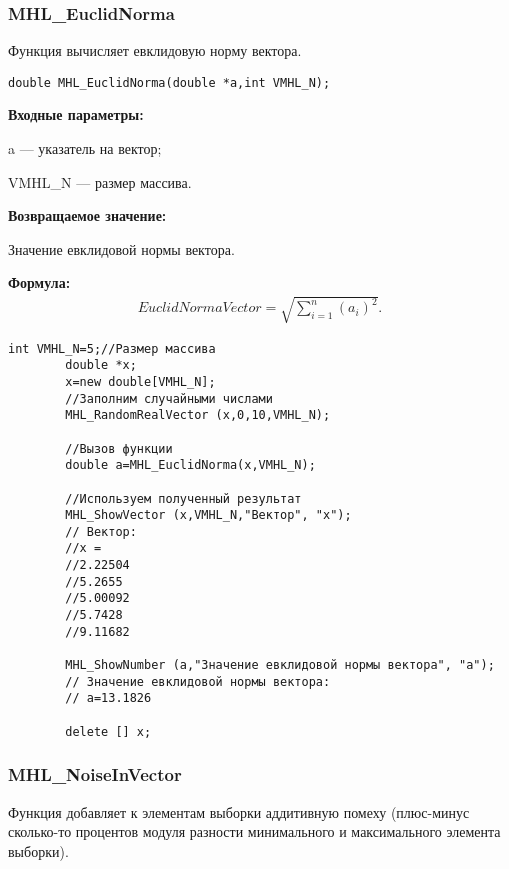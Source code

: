 \documentclass[a4paper,12pt]{article}
\begin{document}
\subsubsection{MHL\_EuclidNorma}\label{MHL_EuclidNorma}

Функция вычисляет евклидовую норму вектора.


\begin{lstlisting}[label=code_syntax_MHL_EuclidNorma,caption=Синтаксис]
double MHL_EuclidNorma(double *a,int VMHL_N);
\end{lstlisting}

\textbf{Входные параметры:}  

 a --- указатель на вектор;
 
 VMHL\_N ---  размер массива.
 
\textbf{Возвращаемое значение:}

 Значение евклидовой нормы вектора.

\textbf{Формула:}
\begin{eqnarray*}
EuclidNormaVector=\sqrt{\sum_{i=1}^{n} {\left( a_i\right)}^2 }.
\end{eqnarray*}


\begin{lstlisting}[label=code_use_MHL_EuclidNorma,caption=Пример использования]
        int VMHL_N=5;//Размер массива
        double *x;
        x=new double[VMHL_N];
        //Заполним случайными числами
        MHL_RandomRealVector (x,0,10,VMHL_N);

        //Вызов функции
        double a=MHL_EuclidNorma(x,VMHL_N);

        //Используем полученный результат
        MHL_ShowVector (x,VMHL_N,"Вектор", "x");
        // Вектор:
        //x =
        //2.22504
        //5.2655
        //5.00092
        //5.7428
        //9.11682

        MHL_ShowNumber (a,"Значение евклидовой нормы вектора", "a");
        // Значение евклидовой нормы вектора:
        // a=13.1826

        delete [] x;
\end{lstlisting}

\subsubsection{MHL\_NoiseInVector}\label{MHL_NoiseInVector}

Функция добавляет к элементам выборки аддитивную помеху (плюс-минус сколько-то процентов модуля разности минимального и максимального элемента выборки).
\end{document}
